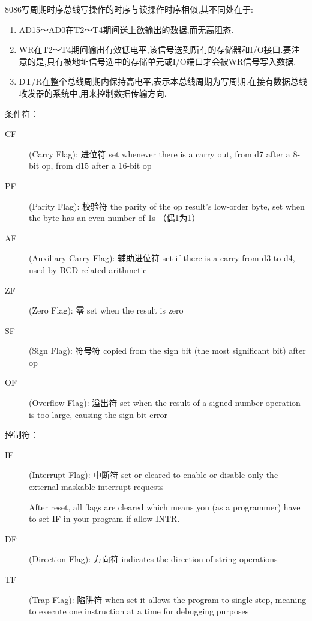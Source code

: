 8086写周期时序总线写操作的时序与读操作时序相似,其不同处在于:
\begin{enumerate}
\item 	
AD15～AD0在T2～T4期间送上欲输出的数据,而无高阻态.
\item WR在T2～T4期间输出有效低电平,该信号送到所有的存储器和I/O接口.要注意的是,只有被地址信号选中的存储单元或I/O端口才会被WR信号写入数据.
\item DT/R在整个总线周期内保持高电平,表示本总线周期为写周期.在接有数据总线收发器的系统中,用来控制数据传输方向.
\end{enumerate}

条件符：
\begin{description}
	\item[CF](Carry Flag): 进位符 set whenever there is a carry out, from d7 after a 8-bit op, from d15 after a 16-bit op
	\item[PF](Parity Flag): 校验符 the parity of the op result’s low-order byte,  set when the byte has an even number of 1s （偶1为1）
	\item[AF](Auxiliary Carry Flag): 辅助进位符 set if there is a carry from d3 to d4, used by BCD-related arithmetic
	\item[ZF](Zero Flag): 零 set when the result is zero
	\item[SF](Sign Flag): 符号符 copied from the sign bit (the most significant bit) after op
	\item[OF](Overflow Flag): 溢出符 set when the result of a signed number operation is too large, causing the sign bit error
\end{description}
控制符：
\begin{description}
	\item[IF] (Interrupt Flag): 中断符 set or cleared to enable or disable only the external maskable interrupt requests
	 
	{\scriptsize
		After reset, all flags are cleared which means you (as a programmer) have to set IF in your program if allow INTR.
	}
	\item[DF] (Direction Flag): 方向符 indicates the direction of string operations
	\item[TF] (Trap Flag): 陷阱符 when set it allows the program to single-step, meaning to execute one instruction at a time for debugging purposes
\end{description}

% 